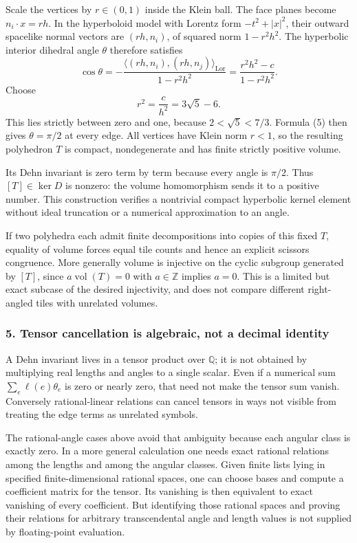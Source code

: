 \documentclass[11pt]{article}
\begin{document}
Scale the vertices by $r\in(0,1)$ inside the Klein ball. The face planes become $n_i\cdot x=rh$. In the hyperboloid model with Lorentz form $-t^2+|x|^2$, their outward spacelike normal vectors are $(rh,n_i)$, of squared norm $1-r^2h^2$. The hyperbolic interior dihedral angle $\theta$ therefore satisfies
\[
 \cos\theta=-\frac{\langle(rh,n_i),(rh,n_j)\rangle_{\mathrm{Lor}}}
                    {1-r^2h^2}
 =\frac{r^2h^2-c}{1-r^2h^2}.                          \tag{5}
\]
Choose
\[
 r^2=\frac{c}{h^2}=3\sqrt5-6.
\]
This lies strictly between zero and one, because $2<\sqrt5<7/3$. Formula (5) then gives $\theta=\pi/2$ at every edge. All vertices have Klein norm $r<1$, so the resulting polyhedron $T$ is compact, nondegenerate and has finite strictly positive volume.

Its Dehn invariant is zero term by term because every angle is $\pi/2$. Thus $[T]\in\ker D$ is nonzero: the volume homomorphism sends it to a positive number. This construction verifies a nontrivial compact hyperbolic kernel element without ideal truncation or a numerical approximation to an angle.

If two polyhedra each admit finite decompositions into copies of this fixed $T$, equality of volume forces equal tile counts and hence an explicit scissors congruence. More generally volume is injective on the cyclic subgroup generated by $[T]$, since $a\operatorname{vol}(T)=0$ with $a\in\mathbb Z$ implies $a=0$. This is a limited but exact subcase of the desired injectivity, and does not compare different right-angled tiles with unrelated volumes.

\subsubsection{5. Tensor cancellation is algebraic, not a decimal identity}
A Dehn invariant lives in a tensor product over $\mathbb Q$; it is not obtained by multiplying real lengths and angles to a single scalar. Even if a numerical sum $\sum_e\ell(e)\theta_e$ is zero or nearly zero, that need not make the tensor sum vanish. Conversely rational-linear relations can cancel tensors in ways not visible from treating the edge terms as unrelated symbols.

The rational-angle cases above avoid that ambiguity because each angular class is exactly zero. In a more general calculation one needs exact rational relations among the lengths and among the angular classes. Given finite lists lying in specified finite-dimensional rational spaces, one can choose bases and compute a coefficient matrix for the tensor. Its vanishing is then equivalent to exact vanishing of every coefficient. But identifying those rational spaces and proving their relations for arbitrary transcendental angle and length values is not supplied by floating-point evaluation.
\end{document}
